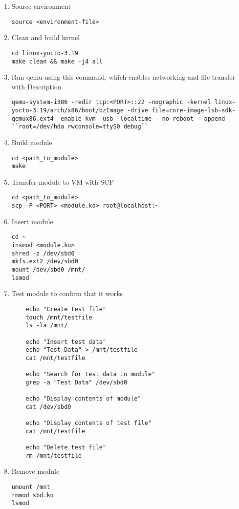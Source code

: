 \documentclass[onecolumn, draftclsnofoot,10pt, compsoc]{IEEEtran}
\begin{document}
	\begin{enumerate}

	\item Source environment
	\begin{lstlisting}
source <environment-file>
\end{lstlisting}

	\item Clean and build kernel
	\begin{lstlisting}
cd linux-yocto-3.19
make clean && make -j4 all
\end{lstlisting}

	\item Run qemu using this command, which enables networking and file transfer with Description
	\begin{lstlisting}
qemu-system-i386 -redir tcp:<PORT>::22 -nographic -kernel linux-yocto-3.19/arch/x86/boot/bzImage -drive file=core-image-lsb-sdk-qemux86.ext4 -enable-kvm -usb -localtime --no-reboot --append ``root=/dev/hda rwconsole=ttyS0 debug``
\end{lstlisting}

\item Build module
\begin{lstlisting}
cd <path_to_module>
make
\end{lstlisting}

	\item Transfer module to VM with SCP
	\begin{lstlisting}
cd <path_to_module>
scp -P <PORT> <module.ko> root@localhost:~
\end{lstlisting}

	\item Insert module
	\begin{lstlisting}
cd ~
insmod <module.ko>
shred -z /dev/sbd0
mkfs.ext2 /dev/sbd0
mount /dev/sbd0 /mnt/
lsmod
\end{lstlisting}

	\item Test module to confirm that it works
	\begin{lstlisting}
	echo "Create test file"
	touch /mnt/testfile
	ls -la /mnt/

	echo "Insert test data"
	echo "Test Data" > /mnt/testfile
	cat /mnt/testfile

	echo "Search for test data in module"
	grep -a "Test Data" /dev/sbd0

	echo "Display contents of module"
	cat /dev/sbd0

	echo "Display contents of test file"
	cat /mnt/testfile

	echo "Delete test file"
	rm /mnt/testfile
\end{lstlisting}

\item Remove module
\begin{lstlisting}
umount /mnt
rmmod sbd.ko
lsmod
\end{lstlisting}

	\end{enumerate}
\end{document}
